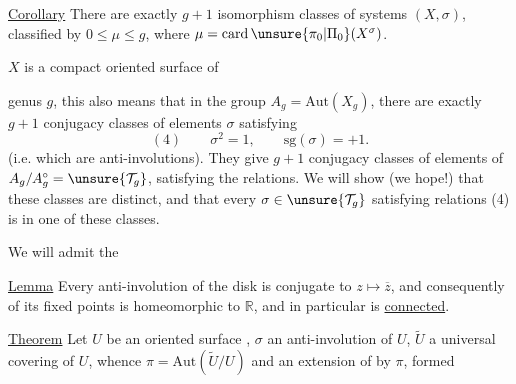 
\uline{Corollary} There are exactly $g+1$ isomorphism classes of systems $(X,\sigma)$, classified by $0\leq\mu\leq g$, where $\mu=\operatorname{card}\unsure{\pi_0|\Pi_0}(X^\sigma)$.


$X$  is a compact oriented surface of



genus $g$, this also means that in the group $A_g=\mathrm{Aut}(X_g)$, there are exactly $g+1$ conjugacy classes of elements $\sigma$ satisfying
\[
(4)\qquad \sigma^2=1,\qquad \mathrm{sg}(\sigma)=+1.
\]
(i.e. which are anti-involutions). They give $g+1$ conjugacy classes of elements of $A_g/A_g^\circ=\unsure{\mathcal{T}_g}$, satisfying the  relations. We will show (we hope!) that these classes are distinct, and that every $\sigma\in\unsure{\mathcal{T}_g}$ satisfying relations (4) is in one of these classes.

We will admit the

\uline{Lemma} Every anti-involution of the  disk  is conjugate to $z\mapsto\overline z$, and consequently  of its fixed points is homeomorphic to $\mathbb R$, and in particular is \uline{connected}.

\uline{Theorem} Let $U$ be an oriented surface ,  $\sigma$ an anti-involution of $U$, $\widetilde U$ a universal covering of $U$, whence $\pi=\mathrm{Aut}(\widetilde U/U)$ and an extension  of  by $\pi$, formed